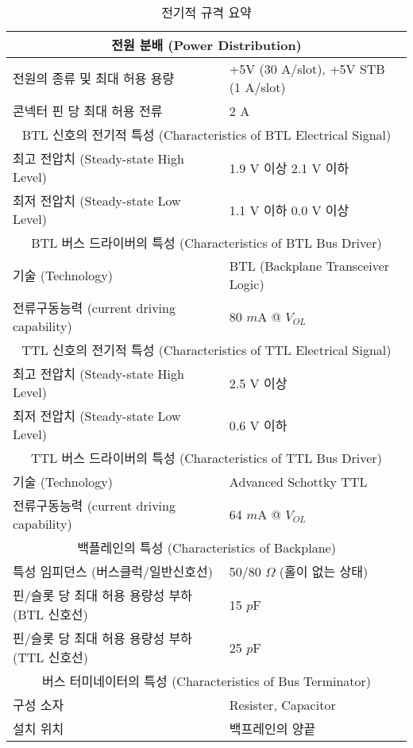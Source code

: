%
%
\begin{table}[htbp]
\caption{전기적 규격 요약}\label{table:elec-spec}
   \begin{center}
   \begin{tabular}{|l l|} \hline
	\multicolumn{2}{|c|}{전원 분배 (Power Distribution)} \\ \hline
	전원의 종류 및 최대 허용 용량 & +5V (30 A/slot), +5V STB (1 A/slot) \\
	콘넥터 핀 당 최대 허용 전류 & 2 A \\ \hline
	\multicolumn{2}{|c|}{BTL 신호의 전기적 특성 (Characteristics of BTL Electrical Signal)} \\ \hline
	최고 전압치 (Steady-state High Level) & 1.9 V 이상  2.1 V 이하 \\
	최저 전압치 (Steady-state Low Level) & 1.1 V 이하 0.0 V 이상 \\ \hline
	\multicolumn{2}{|c|}{BTL 버스 드라이버의 특성 (Characteristics of BTL Bus Driver)} \\ \hline
	기술 (Technology) & BTL (Backplane Transceiver Logic) \\
	전류구동능력 (current driving capability) & 80 $m$A @ $V_{OL}$ \\ \hline
	\multicolumn{2}{|c|}{TTL 신호의 전기적 특성 (Characteristics of TTL Electrical Signal)} \\ \hline
	최고 전압치 (Steady-state High Level) & 2.5 V 이상 \\
	최저 전압치 (Steady-state Low Level) & 0.6 V 이하 \\ \hline
	\multicolumn{2}{|c|}{TTL 버스 드라이버의 특성 (Characteristics of TTL Bus Driver)} \\ \hline
	기술 (Technology) & Advanced Schottky TTL \\
	전류구동능력 (current driving capability) & 64 $m$A @ $V_{OL}$ \\ \hline
	\multicolumn{2}{|c|}{백플레인의 특성 (Characteristics of Backplane)} \\ \hline
	특성 임피던스 (버스클럭/일반신호선) & 50/80 $\Omega$ (홀이 없는 상태) \\
	핀/슬롯 당 최대 허용 용량성 부하 (BTL 신호선)& 15 $p$F \\
	핀/슬롯 당 최대 허용 용량성 부하 (TTL 신호선)& 25 $p$F \\ \hline
	\multicolumn{2}{|c|}{버스 터미네이터의 특성 (Characteristics of Bus Terminator)} \\ \hline
	구성 소자 & Resister, Capacitor \\
	설치 위치 & 백프레인의 양끝 \\ \hline
   \end{tabular}
   \end{center}
\end{table}
%
%
